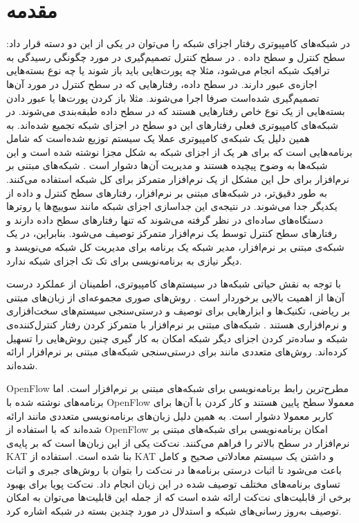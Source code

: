\chapter{مقدمه}
در شبکه‌های کامپیوتری رفتار اجزای شبکه‌ را می‌توان در یکی از این دو دسته قرار داد:
سطح کنترل%
 و سطح داده%
.
در سطح کنترل تصمیم‌گیری در مورد چگونگی رسیدگی به ترافیک شبکه انجام می‌شود، مثلا چه پورت‌هایی باید باز شوند یا چه نوع بسته‌هایی اجازه‌ی عبور دارند.
در سطح داده، رفتار‌هایی که در سطح کنترل در مورد آن‌ها تصمیم‌گیری شده‌است صرفا اجرا می‌شوند. 
مثلا باز کردن پورت‌ها یا عبور دادن بسته‌هایی از یک نوع خاص 
رفتار‌هایی هستند که در سطح داده طبقه‌‌بندی می‌شوند.
در شبکه‌های کامپیوتری فعلی رفتار‌های این دو سطح در اجزای شبکه تجمیع شده‌اند.
به همین دلیل یک شبکه‌ی کامپیوتری عملا یک سیستم توزیع شده‌است که شامل برنامه‌هایی است که برای هر یک از اجزای شبکه به شکل مجزا نوشته شده است و این شبکه‌ها به وضوح پیچیده هستند و مدیریت آن‌ها دشوار است
\cite{sdn-survey}.
شبکه‌های مبتنی بر نرم‌افزار%
برای حل این مشکل از یک نرم‌افزار متمرکز برای کل‌ شبکه استفاده می‌کنند.
به طور دقیق‌تر، در شبکه‌های مبتنی بر نرم‌افزار، رفتار‌های سطح کنترل و داده از یکدیگر جدا می‌شوند. 
در نتیجه‌ی این جداسازی اجزای شبکه مانند سوییچ‌ها یا روترها دستگاه‌های ساده‌ای در نظر گرفته می‌شوند که تنها رفتار‌های سطح داده دارند و رفتار‌های سطح کنترل توسط یک نرم‌افزار متمرکز توصیف می‌شود.
بنابراین، در یک شبکه‌ی مبتنی بر نرم‌افزار، مدیر شبکه یک برنامه برای مدیریت کل شبکه می‌نویسد و دیگر نیازی به برنامه‌نویسی برای تک تک اجزای شبکه ندارد.

با توجه به نقش حیاتی شبکه‌ها در سیستم‌های کامپیوتری، اطمینان از عملکرد درست آن‌ها از اهمیت بالایی برخوردار است 
\cite{foerster2018survey}.
روش‌های صوری%
مجموعه‌ای از زبان‌های مبتنی بر ریاضی، تکنیک‌ها و ابزار‌هایی برای توصیف و درستی‌سنجی سیستم‌های سخت‌افزاری و نرم‌افزاری هستند
\cite{clarke1996formal}.
شبکه‌های مبتنی بر نرم‌افزار با متمرکز کردن رفتار کنترل‌کننده‌ی شبکه و ساده‌تر کردن اجزای دیگر شبکه امکان به کار گیری چنین روش‌هایی را تسهیل کرده‌اند.
روش‌های متعددی مانند
\cite{al2010flowchecker,khurshid2013veriflow,not-nice,zeng2014libra}
برای درستی‌سنجی شبکه‌های مبتنی بر نرم‌افزار ارائه شده‌اند.

OpenFlow
\cite{mckeown2008openflow}
مطرح‌ترین رابط برنامه‌نویسی%
برای شبکه‌های مبتنی بر نرم‌افزار است.
اما برنامه‌های نوشته شده با 
OpenFlow
معمولا سطح پایین هستند و کار کردن با آن‌ها برای کاربر معمولا دشوار است. 
به همین دلیل زبان‌های برنامه‌نویسی متعددی مانند
\cite{foster2011frenetic,voellmy2011nettle,netcore,procera,pyretic,netkat}
ارائه شده‌اند
که با استفاده از 
OpenFlow
امکان برنامه‌نویسی برای شبکه‌های مبتنی بر نرم‌افزار در سطح بالاتر را فراهم می‌کنند.
نت‌کت یکی از این زبان‌ها است%
 \cite{netkat} که بر پایه‌ی
KAT \cite{kat}
بنا شده است.
استفاده از 
KAT
و داشتن یک سیستم معادلاتی صحیح%
و کامل%
باعث می‌شود تا اثبات درستی برنامه‌ها در نت‌کت را بتوان با روش‌های جبری و اثبات تساوی برنامه‌های مختلف توصیف شده در این زبان انجام داد.
نت‌کت پویا%
\cite{dynetkat}
برای بهبود برخی از قابلیت‌های نت‌کت ارائه شده است که از جمله این قابلیت‌ها می‌توان به امکان توصیف به‌روز رسانی‌های شبکه و استدلال در مورد چندین بسته در شبکه اشاره کرد.


